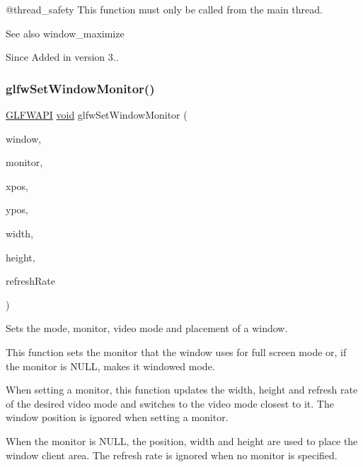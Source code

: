 @thread\+\_\+safety This function must only be called from the main thread.

\begin{DoxySeeAlso}{See also}
window\+\_\+maximize
\end{DoxySeeAlso}
\begin{DoxySince}{Since}
Added in version 3.. 
\end{DoxySince}
\mbox{\label{group__window_ga12fabf78575e59c00f822f323ae0b6ae}} 
\subsubsection{\texorpdfstring{glfwSetWindowMonitor()}{glfwSetWindowMonitor()}}
{\footnotesize\ttfamily \mbox{\hyperlink{glfw3_8h_a56da5036b2cc259351ae22fd6439bb47}{G\+L\+F\+W\+A\+PI}} \mbox{\hyperlink{glad_8h_a950fc91edb4504f62f1c577bf4727c29}{void}} glfw\+Set\+Window\+Monitor (\begin{DoxyParamCaption}\item[{\mbox{\hyperlink{group__window_ga3c96d80d363e67d13a41b5d1821f3242}{G\+L\+F\+Wwindow}} $\ast$}]{window,  }\item[{\mbox{\hyperlink{group__monitor_ga8d9efd1cde9426692c73fe40437d0ae3}{G\+L\+F\+Wmonitor}} $\ast$}]{monitor,  }\item[{int}]{xpos,  }\item[{int}]{ypos,  }\item[{int}]{width,  }\item[{int}]{height,  }\item[{int}]{refresh\+Rate }\end{DoxyParamCaption})}



Sets the mode, monitor, video mode and placement of a window. 

This function sets the monitor that the window uses for full screen mode or, if the monitor is {\ttfamily N\+U\+LL}, makes it windowed mode.

When setting a monitor, this function updates the width, height and refresh rate of the desired video mode and switches to the video mode closest to it. The window position is ignored when setting a monitor.

When the monitor is {\ttfamily N\+U\+LL}, the position, width and height are used to place the window client area. The refresh rate is ignored when no monitor is specified.

